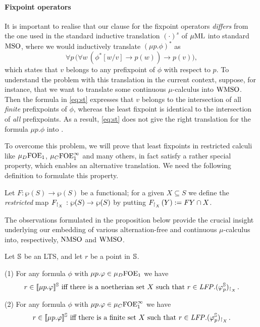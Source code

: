 \paragraph{Fixpoint operators} 
It is important to realise that our clause for the fixpoint operators
\emph{differs} from the one used in the standard inductive translation 
$(\cdot)^{s}$ of $\mu\mathrm{ML}$ into standard $\mathrm{MSO}$, where we would inductively
translate $(\mu p. \phi)^{*}$ as
\begin{equation}
\label{eq:st}
\forall p\, \big( \forall w\, (\phi^{*}[w/v] \to p(w)) \to p(v) \big),
\end{equation}
which states that $v$ belongs to any prefixpoint of $\phi$ with respect to $p$.
To understand the problem with this translation in the current context, suppose,
for instance, that we want to translate some continuous $\mu$-calculus into
$\mathrm{WMSO}$.
Then the formula in \eqref{eq:st} expresses that $v$ 
belongs to the intersection of all \emph{finite} prefixpoints of $\phi$, whereas
the least fixpoint is identical to the intersection of \emph{all} prefixpoints.
As a result, \eqref{eq:st} does not give the right translation for the formula 
$\mu p.\phi$ into \wmso.

To overcome this problem, we will prove that least fixpoints in restricted 
calculi like $\mu_{D}\mathrm{FOE}_1$, $\mu_{C}\mathrm{FOE}^{\infty}_1$ and many others, in fact satisfy a
rather special property, which enables an alternative translation.
We need the following definition to formulate this property.

\begin{definition}
\label{d:rst}
Let $F: \wp(S)\to \wp(S)$ be a functional; for a given $X \subseteq S$ we define
the \emph{restricted} map $F_{{\upharpoonright}_{X}\,}: \wp(S)\to \wp(S)$ by putting 
$F_{{\upharpoonright}_{X}\,}(Y) \mathrel{:=} FY \cap X$.
\end{definition}

The observations formulated in the proposition below provide the crucial insight
underlying our embedding of various alternation-free and continuous 
$\mu$-calculus into, respectively, $\mathrm{NMSO}$ and $\mathrm{WMSO}$.

\begin{proposition}
\label{p:afmc-rstGen}
\label{p:keyfix}
Let $\mathbb{S}$ be an LTS, and let $r$ be a point in $\mathbb{S}$.

(1) For any formula $\phi$ with $\mu p. \varphi \in \mu_{D}\mathrm{FOE}_1$ we have
\begin{equation}
\label{eq:foe-d}
r \in \mng{\mu p.\phi}^{\model} \text{ iff there is a noetherian set $X$ such 
that } r \in \LFP. (\phi^{\model}_{p})_{\rst{X}}.
\end{equation}

(2) For any formula $\phi$ with $\mu p. \varphi \in \mu_{C}\mathrm{FOE}^{\infty}_1$ we have
\begin{equation}
\label{eq:foei-c}
r \in \mng{\mu p.\phi}^{\model} \text{ iff there is a finite set $X$ such 
that } r \in \LFP. (\phi^{\model}_{p})_{\rst{X}}.
\end{equation}
\end{proposition}

